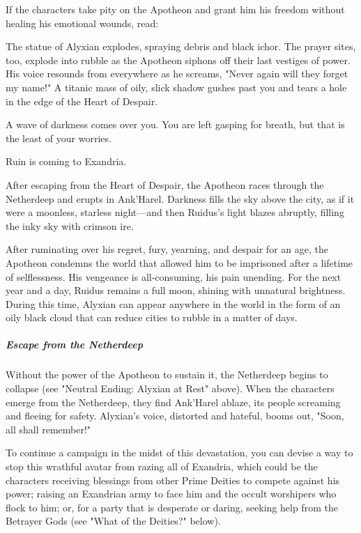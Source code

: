 \documentclass[10pt,a4paper,twoside,bg=print,twocolumn,openany,nodeprecatedcode]{dndbook}
\begin{document}
If the characters take pity on the Apotheon and grant him his freedom without healing his emotional wounds, read:

\begin{DndReadAloud}{}
The statue of Alyxian explodes, spraying debris and black ichor. The prayer sites, too, explode into rubble as the Apotheon siphons off their last vestiges of power. His voice resounds from everywhere as he screams, "Never again will they forget my name!" A titanic mass of oily, slick shadow gushes past you and tears a hole in the edge of the Heart of Despair.

A wave of darkness comes over you. You are left gasping for breath, but that is the least of your worries.

Ruin is coming to Exandria.

\end{DndReadAloud}

After escaping from the Heart of Despair, the Apotheon races through the Netherdeep and erupts in Ank'Harel. Darkness fills the sky above the city, as if it were a moonless, starless night—and then Ruidus's light blazes abruptly, filling the inky sky with crimson ire.

After ruminating over his regret, fury, yearning, and despair for an age, the Apotheon condemns the world that allowed him to be imprisoned after a lifetime of selflessness. His vengeance is all-consuming, his pain unending. For the next year and a day, Ruidus remains a full moon, shining with unnatural brightness. During this time, Alyxian can appear anywhere in the world in the form of an oily black cloud that can reduce cities to rubble in a matter of days.

\subparagraph{Escape from the Netherdeep}
Without the power of the Apotheon to sustain it, the Netherdeep begins to collapse (see "Neutral Ending: Alyxian at Rest" above). When the characters emerge from the Netherdeep, they find Ank'Harel ablaze, its people screaming and fleeing for safety. Alyxian's voice, distorted and hateful, booms out, "Soon, all shall remember!"

To continue a campaign in the midst of this devastation, you can devise a way to stop this wrathful avatar from razing all of Exandria, which could be the characters receiving blessings from other Prime Deities to compete against his power; raising an Exandrian army to face him and the occult worshipers who flock to him; or, for a party that is desperate or daring, seeking help from the Betrayer Gods (see "What of the Deities?" below).
\end{document}
